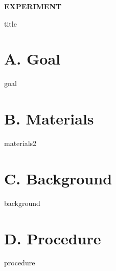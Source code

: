 \documentclass[cover.tex]{subfiles}
\begin{document}
 


\hfill\vspace{0.2cm}\begin{center}{\large \bfseries EXPERIMENT \thechapter\par\Huge
 {title}
 \\[5pt] \par}\vspace{0.2cm}\end{center}\par\noindent
 
 
\section*{A. Goal}
{goal}
\section*{B. Materials}
{materials2}
\section*{C. Background}
{background}



\section*{D. Procedure}
{procedure}
\clearpage\mbox{}\clearpage
\end{document}
